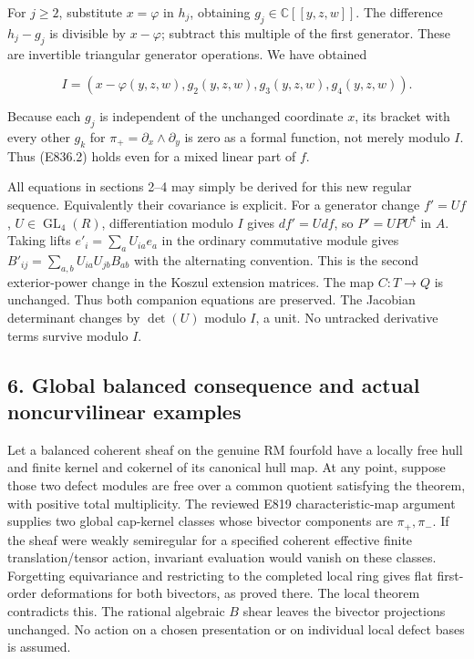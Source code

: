 For \(j\ge2\), substitute \(x=\varphi\) in \(h_j\), obtaining
\(g_j\in\mathbb C[[y,z,w]]\). The difference \(h_j-g_j\) is divisible by
\(x-\varphi\); subtract this multiple of the first generator. These are
invertible triangular generator operations. We have obtained

\[
 I=(x-\varphi(y,z,w),g_2(y,z,w),g_3(y,z,w),g_4(y,z,w)).
 \tag{E836.18}
\]

Because each \(g_j\) is independent of the unchanged coordinate \(x\),
its bracket with every other \(g_k\) for
\(\pi_+=\partial_x\wedge\partial_y\) is zero as a formal function, not
merely modulo \(I\). Thus (E836.2) holds even for a mixed linear part of
\(f\).

All equations in sections 2--4 may simply be derived for this new
regular sequence. Equivalently their covariance is explicit. For a
generator change \(f'=Uf\), \(U\in\operatorname{GL}_4(R)\),
differentiation modulo \(I\) gives \(df'=Udf\), so
\(P'=UPU^{\mathsf t}\) in \(A\). Taking lifts \(e'_i=\sum_a U_{ia}e_a\)
in the ordinary commutative module gives
\(B'_{ij}=\sum_{a,b}U_{ia}U_{jb}B_{ab}\) with the alternating
convention. This is the second exterior-power change in the Koszul
extension matrices. The map \(C:T\to Q\) is unchanged. Thus both
companion equations are preserved. The Jacobian determinant changes by
\(\det(U)\) modulo \(I\), a unit. No untracked derivative terms survive
modulo \(I\).

\subsection{6. Global balanced consequence and actual noncurvilinear
examples}\label{SF-E836:global-balanced-consequence-and-actual-noncurvilinear-examples}

Let a balanced coherent sheaf on the genuine RM fourfold have a locally
free hull and finite kernel and cokernel of its canonical hull map. At
any point, suppose those two defect modules are free over a common
quotient satisfying the theorem, with positive total multiplicity. The
reviewed E819 characteristic-map argument supplies two global cap-kernel
classes whose bivector components are \(\pi_+,\pi_-\). If the sheaf were
weakly semiregular for a specified coherent effective finite
translation/tensor action, invariant evaluation would vanish on these
classes. Forgetting equivariance and restricting to the completed local
ring gives flat first-order deformations for both bivectors, as proved
there. The local theorem contradicts this. The rational algebraic \(B\)
shear leaves the bivector projections unchanged. No action on a chosen
presentation or on individual local defect bases is assumed.

